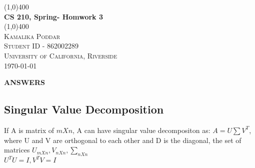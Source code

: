 \documentclass[12pt, oneside]{article}   	%
\begin{document}
	
\begin{titlepage}
	\begin{center}
	\line(1,0){400} \\
    [0.25in]
    \Huge{\bfseries CS 210, Spring- Homwork 3} \\
    [2mm]
    \line(1,0){400} \\
    [3 cm]
    
    \textsc{\LARGE Kamalika Poddar} \\
   
    \textsc{\LARGE Student ID - 862002289 } \\
  
    \textsc{\LARGE University of California, Riverside} \\
    [0.7cm]
  \vspace*{7 cm}
  \today
    \end{center} 

\end{titlepage}

\newpage
\vspace{2cm}

\begin{center}
\textbf{ \Large ANSWERS}\\
\end{center}

\vspace{0.5cm}

\subsection*{Singular Value Decomposition}

If A is matrix of $mXn$, A can have singular value decompositon as: $A=U\sum V^T$, where U and V are orthogonal to each other and  D is the diagonal, the set of matrices  $U_{mXn}, V_{nXn}, \sum_{nXn}$\\
$U^TU=I, V^TV=I$
\end{document}
